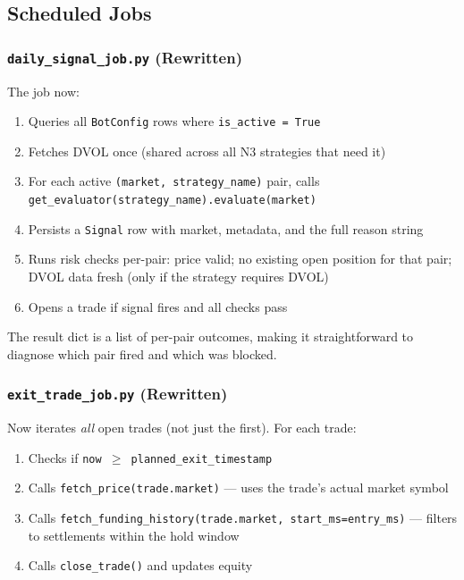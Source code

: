 \documentclass[11pt,a4paper]{article}
\newcommand{\code}[1]{\texttt{#1}}
\begin{document}
\subsection{Scheduled Jobs}

\subsubsection*{\code{daily\_signal\_job.py} (Rewritten)}

The job now:
\begin{enumerate}[noitemsep]
  \item Queries all \code{BotConfig} rows where \code{is\_active = True}
  \item Fetches DVOL once (shared across all N3 strategies that need it)
  \item For each active \code{(market, strategy\_name)} pair, calls \code{get\_evaluator(strategy\_name).evaluate(market)}
  \item Persists a \code{Signal} row with market, metadata, and the full reason string
  \item Runs risk checks per-pair: price valid; no existing open position for that pair; DVOL data fresh (only if the strategy requires DVOL)
  \item Opens a trade if signal fires and all checks pass
\end{enumerate}

The result dict is a list of per-pair outcomes, making it straightforward to diagnose which pair fired and which was blocked.

\subsubsection*{\code{exit\_trade\_job.py} (Rewritten)}

Now iterates \emph{all} open trades (not just the first). For each trade:
\begin{enumerate}[noitemsep]
  \item Checks if \code{now $\geq$ planned\_exit\_timestamp}
  \item Calls \code{fetch\_price(trade.market)} --- uses the trade's actual market symbol
  \item Calls \code{fetch\_funding\_history(trade.market, start\_ms=entry\_ms)} --- filters to settlements within the hold window
  \item Calls \code{close\_trade()} and updates equity
\end{enumerate}
\end{document}
